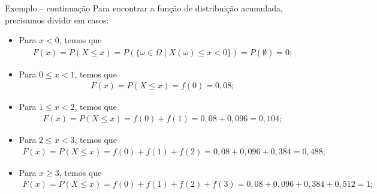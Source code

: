 \documentclass[9pt]{beamer}
\begin{document}
\begin{frame}{Exemplo -- continuação}
Para encontrar a função de distribuição acumulada, precisamos dividir em casos:

{\scriptsize
  \begin{itemize}
   \item Para $x <0$, temos que 
   \begin{align*}
    F(x) = P(X \leq x) = P\left( \{\omega \in \Omega \mid X(\omega) \leq x <0 \} \right) = P(\emptyset) = 0; 
   \end{align*}
   \item Para $0 \leq x < 1$, temos que
   \begin{align*}
    F(x) = P(X \leq x) = f(0) = 0,08;
   \end{align*}
   \item Para $1 \leq x < 2$, temos que
   \begin{align*}
    F(x) = P(X \leq x) = f(0)+f(1) = 0,08+0,096 = 0,104;
   \end{align*}
   \item Para $2 \leq x < 3$, temos que
   \begin{align*}
    F(x) = P(X \leq x) = f(0)+f(1)+f(2) = 0,08+0,096+0,384 = 0,488;
   \end{align*}
   \item Para $x \geq 3$, temos que
   \begin{align*}
    F(x) = P(X \leq x) = f(0)+f(1)+f(2)+f(3) = 0,08+0,096+0,384+0,512 = 1;
   \end{align*}
   
  \end{itemize}
} 

\def \array{{0.008,0.104,0.488,1}}
  \begin{figure}
   \centering
  \end{figure}

\end{frame}
\end{document}
